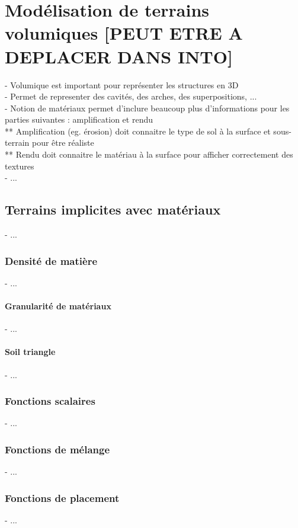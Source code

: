 \chapter{Modélisation de terrains volumiques [PEUT ETRE A DEPLACER DANS INTO]}
\label{chap:volumic-modeling}
\minitoc

- Volumique est important pour représenter les structures en 3D \\
- Permet de representer des cavités, des arches, des superpositions, ... \\
- Notion de matériaux permet d'inclure beaucoup plus d'informations pour les parties suivantes : amplification et rendu \\
** Amplification (eg. érosion) doit connaitre le type de sol à la surface et sous-terrain pour être réaliste \\
** Rendu doit connaitre le matériau à la surface pour afficher correctement des textures \\
- ...


\section{Terrains implicites avec matériaux}
\label{sec:volumic-modeling_implicit-terrain-with-materials}
- ...

\subsection{Densité de matière}
- ...

\subsubsection{Granularité de matériaux}
- ...

\subsubsection{Soil triangle}
- ...

\subsection{Fonctions scalaires}
- ...

\subsection{Fonctions de mélange}
- ...

\subsection{Fonctions de placement}
- ...

